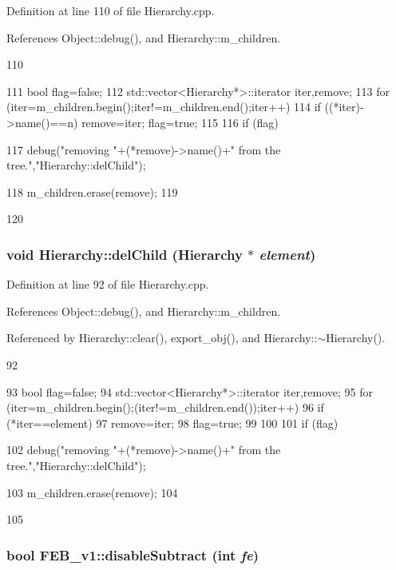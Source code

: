 Definition at line 110 of file Hierarchy.cpp.

References Object::debug(), and Hierarchy::m\_\-children.


\begin{DoxyCode}
110                                    {
111   bool flag=false;
112   std::vector<Hierarchy*>::iterator iter,remove;
113   for (iter=m_children.begin();iter!=m_children.end();iter++){
114     if ((*iter)->name()==n){ remove=iter; flag=true;}
115   }
116   if (flag){
117     debug("removing "+(*remove)->name()+" from the tree.","Hierarchy::delChild");
      
118     m_children.erase(remove);
119   }
120 }
\end{DoxyCode}
\hypertarget{classHierarchy_a2b2b359fac003233f65786a616766bde}{
\subsubsection[{delChild}]{\setlength{\rightskip}{0pt plus 5cm}void Hierarchy::delChild ({\bf Hierarchy} $\ast$ {\em element})}}
\label{classHierarchy_a2b2b359fac003233f65786a616766bde}


Definition at line 92 of file Hierarchy.cpp.

References Object::debug(), and Hierarchy::m\_\-children.

Referenced by Hierarchy::clear(), export\_\-obj(), and Hierarchy::$\sim$Hierarchy().


\begin{DoxyCode}
92                                           {
93   bool flag=false;
94   std::vector<Hierarchy*>::iterator iter,remove;
95   for (iter=m_children.begin();(iter!=m_children.end());iter++){
96     if (*iter==element){
97       remove=iter;
98       flag=true;
99     }
100   }
101   if (flag){
102     debug("removing "+(*remove)->name()+" from the tree.","Hierarchy::delChild");
      
103     m_children.erase(remove);
104   }
105 }
\end{DoxyCode}
\hypertarget{classFEB__v1_a3d224acca0807603d14b72cff6359b3f}{
\subsubsection[{disableSubtract}]{\setlength{\rightskip}{0pt plus 5cm}bool FEB\_\-v1::disableSubtract (int {\em fe})}}
\label{classFEB__v1_a3d224acca0807603d14b72cff6359b3f}


